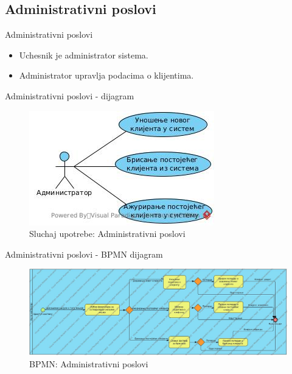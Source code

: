 \documentclass[11pt]{beamer}
\begin{document}
\subsection{Administrativni poslovi}
\begin{frame}{Administrativni poslovi}
\begin{itemize}
    \item Uchesnik je administrator sistema.
    \item Administrator upravlja podacima o klijentima.
\end{itemize}
\end{frame}
\begin{frame}{Administrativni poslovi - dijagram}
\begin{figure}
    \centering
    \includegraphics[scale=0.8]{Slike/UML/SUadministrativniPoslovi.jpg}
    \caption{Sluchaj upotrebe: Administrativni poslovi}
\end{figure}
\end{frame}
\begin{frame}{Administrativni poslovi - BPMN dijagram}
\begin{figure}
    \centering
    \includegraphics[scale=0.25]{Slike/BPMN/BPMNadministrativniPoslovi.jpg}
    \caption{BPMN: Administrativni poslovi}
\end{figure}
\end{frame}
\end{document}
